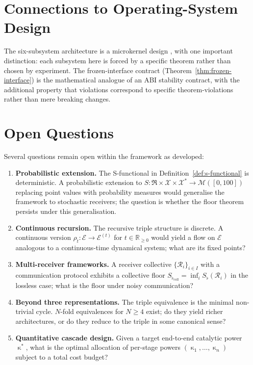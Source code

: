 \documentclass[twocolumn,a4paper]{article}
\DeclareMathOperator{\catpow}{\kappa}
\newcommand{\Real}{\mathbb{R}}
\newcommand{\Cands}{\mathcal{X}}
\newcommand{\Truth}{\mathcal{X}^{*}}
\newcommand{\Expr}{\mathcal{E}}
\newcommand{\receiver}{\mathcal{R}}
\newcommand{\Receiver}{\mathfrak{R}}
\newcommand{\Sscalar}{S}
\newcommand{\Sfloor}{S_{\flat}}
\begin{document}
\section{Connections to Operating-System Design}
\label{sec:os-design}

The six-subsystem architecture is a microkernel design \citep{liedtke1995microkernel,tanenbaum2014modern}, with one important distinction: each subsystem here is forced by a specific theorem rather than chosen by experiment. The frozen-interface contract (Theorem~\ref{thm:frozen-interface}) is the mathematical analogue of an ABI stability contract, with the additional property that violations correspond to specific theorem-violations rather than mere breaking changes.

\section{Open Questions}
\label{sec:open-questions}

Several questions remain open within the framework as developed:
\begin{enumerate}[nosep,leftmargin=*]
\item \textbf{Probabilistic extension.} The S-functional in Definition~\ref{def:s-functional} is deterministic. A probabilistic extension to $\Sscalar\colon\Receiver\times\Cands\times\Truth\to\mathcal{M}([0,100])$ replacing point values with probability measures would generalise the framework to stochastic receivers; the question is whether the floor theorem persists under this generalisation.
\item \textbf{Continuous recursion.} The recursive triple structure is discrete. A continuous version $\rho_{t}\colon\Expr\to\Expr^{(t)}$ for $t\in\Real_{\geq 0}$ would yield a flow on $\Expr$ analogous to a continuous-time dynamical system; what are its fixed points?
\item \textbf{Multi-receiver frameworks.} A receiver collective $\{\receiver_{i}\}_{i\in I}$ with a communication protocol exhibits a collective floor $\Sfloor_{\text{coll}}=\inf_{i}\Sfloor(\receiver_{i})$ in the lossless case; what is the floor under noisy communication?
\item \textbf{Beyond three representations.} The triple equivalence is the minimal non-trivial cycle. $N$-fold equivalences for $N\geq 4$ exist; do they yield richer architectures, or do they reduce to the triple in some canonical sense?
\item \textbf{Quantitative cascade design.} Given a target end-to-end catalytic power $\catpow^{*}$, what is the optimal allocation of per-stage powers $(\catpow_{1},\ldots,\catpow_{n})$ subject to a total cost budget?
\end{enumerate}
\end{document}
